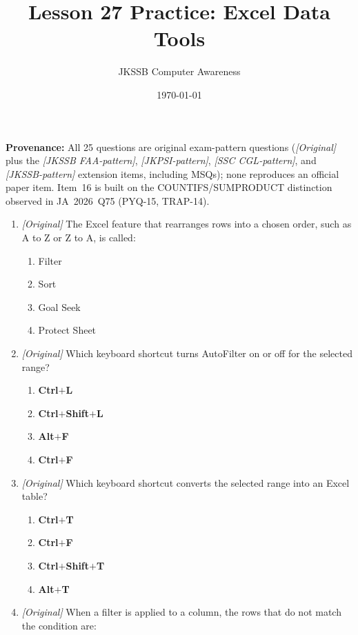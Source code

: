 \documentclass[11pt]{article}
\title{Lesson 27 Practice: Excel Data Tools}
\author{JKSSB Computer Awareness}
\date{\today}
\begin{document}
\maketitle
\noindent\textbf{Provenance:} All 25 questions are original exam-pattern questions (\textit{[Original]} plus the \textit{[JKSSB FAA-pattern]}, \textit{[JKPSI-pattern]}, \textit{[SSC CGL-pattern]}, and \textit{[JKSSB-pattern]} extension items, including MSQs); none reproduces an official paper item. Item~16
is built on the COUNTIFS/SUMPRODUCT distinction observed in JA~2026~Q75
(PYQ-15, TRAP-14).

\begin{enumerate}[label=\textbf{Q\arabic*.}, leftmargin=*]
\item \textit{[Original]} The Excel feature that rearranges rows into a chosen
  order, such as A to Z or Z to A, is called:
  \begin{enumerate}[label=\Alph*.]
    \item Filter
    \item Sort
    \item Goal Seek
    \item Protect Sheet
  \end{enumerate}
\item \textit{[Original]} Which keyboard shortcut turns AutoFilter on or off for
  the selected range?
  \begin{enumerate}[label=\Alph*.]
    \item \textbf{Ctrl}$+$\textbf{L}
    \item \textbf{Ctrl}$+$\textbf{Shift}$+$\textbf{L}
    \item \textbf{Alt}$+$\textbf{F}
    \item \textbf{Ctrl}$+$\textbf{F}
  \end{enumerate}
\item \textit{[Original]} Which keyboard shortcut converts the selected range
  into an Excel table?
  \begin{enumerate}[label=\Alph*.]
    \item \textbf{Ctrl}$+$\textbf{T}
    \item \textbf{Ctrl}$+$\textbf{F}
    \item \textbf{Ctrl}$+$\textbf{Shift}$+$\textbf{T}
    \item \textbf{Alt}$+$\textbf{T}
  \end{enumerate}
\item \textit{[Original]} When a filter is applied to a column, the rows that do
  not match the condition are:
  \begin{enumerate}[label=\Alph*.]

\end{enumerate}
\end{enumerate}
\end{document}
